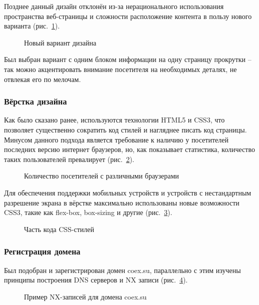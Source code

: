 Позднее данный дизайн отклонён из-за нерационального использования пространства веб-страницы и сложности расположение контента в пользу нового варианта (рис.~\ref{lo2:lo2}).

\begin{figure}[h!]
\center{\texttt{[image: lo2]}}
\caption{ Новый вариант дизайна }
\label{lo2:lo2}
\end{figure}

Был выбран вариант с одним блоком информации на одну страницу прокрутки – так можно акцентировать внимание посетителя на необходимых деталях, не отвлекая его по мелочам.

\subsubsection{ Вёрстка дизайна } 

Как было сказано ранее, используются технологии HTML5 и CSS3, что позволяет существенно сократить код стилей и нагляднее писать код страницы. Минусом данного подхода является требование к наличию у посетителей последних версию интернет браузеров, но, как показывает статистика, количество таких пользователей превалирует (рис.~\ref{lo3:lo3}).

\begin{figure}[h!]
\center{\texttt{[image: lo3]}}
\caption{ Количество посетителей с различными браузерами }
\label{lo3:lo3}
\end{figure}

Для обеспечения поддержки мобильных устройств и устройств с нестандартным разрешение экрана в вёрстке максимально использованы новые возможности CSS3, такие как flex-box, box-sizing и другие (рис.~\ref{lo4:lo4}).

\begin{figure}[h!]
\center{\texttt{[image: lo4]}}
\caption{ Часть кода CSS-стилей }
\label{lo4:lo4}
\end{figure}

\subsubsection{ Регистрация домена }

Был подобран и зарегистрирован домен coex.su, параллельно с этим изучены принципы построения DNS серверов и NX записи (рис.~\ref{lo5:lo5}).

\begin{figure}[h!]
\center{\texttt{[image: lo5]}}
\caption{ Пример NX-записей для домена coex.su }
\label{lo5:lo5}
\end{figure}

